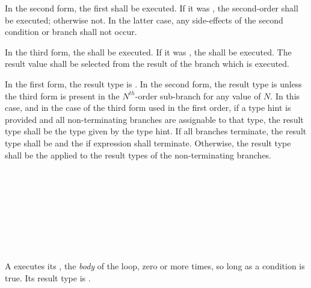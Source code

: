 \specsubsubitem
In the second form, the first  shall be
executed. If it was , the second-order
 shall be executed; otherwise not. In the latter
case, any side-effects of the second condition or branch shall not occur.

\specsubsubitem
In the third form, the  shall be executed. If
it was , the  shall be executed. The
result value shall be selected from the result of the branch which is executed.

\specsubsubitem
In the first form, the result type is . In the second form, the
result type is  unless the third form is present in the
$N^{th}$-order sub-branch for any value of $N$. In this case, and in the case of
the third form used in the first order, if a type hint is provided and all
non-terminating branches are assignable to that type, the result type shall be
the type given by the type hint. If all branches terminate, the result type
shall be  and the if expression shall terminate. Otherwise, the
result type shall be the  applied to the
result types of the non-terminating branches.


\begin{grammar}
 \\
	 \terminal{(}  \terminal{)}  \\

 \\
	 \\
	 \terminal{;}  \\
	 \terminal{;}  \\
	 \terminal{;}  \terminal{;}  \\
\end{grammar}

\specsubsubitem
A  executes its , the
\textit{body} of the loop, zero or more times, so long as a condition is true.
Its result type is .

